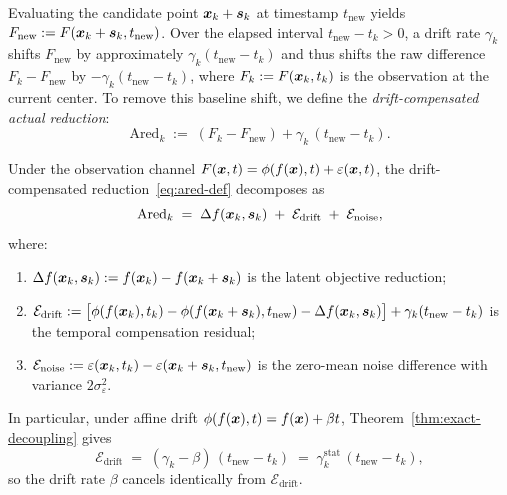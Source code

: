 Evaluating the candidate point $\boldsymbol{x}_k + \boldsymbol{s}_k$ at timestamp $t_{\mathrm{new}}$ yields $F_{\mathrm{new}} := F(\boldsymbol{x}_k + \boldsymbol{s}_k, t_{\mathrm{new}})$. Over the elapsed interval $t_{\mathrm{new}} - t_k > 0$, a drift rate $\gamma_k$ shifts $F_{\mathrm{new}}$ by approximately $\gamma_k(t_{\mathrm{new}} - t_k)$ and thus shifts the raw difference $F_k - F_{\mathrm{new}}$ by $-\gamma_k(t_{\mathrm{new}} - t_k)$, where $F_k := F(\boldsymbol{x}_k, t_k)$ is the observation at the current center. To remove this baseline shift, we define the \emph{drift-compensated actual reduction}:
\begin{equation}\label{eq:ared-def}
  \mathrm{Ared}_k \;:=\; (F_k - F_{\mathrm{new}}) + \gamma_k\,(t_{\mathrm{new}} - t_k).
\end{equation}

\begin{proposition}
\label{prop:ared-decomp}
Under the observation channel $F(\boldsymbol{x},t) = \phi(f(\boldsymbol{x}),t) + \varepsilon(\boldsymbol{x},t)$, the drift-compensated reduction~\eqref{eq:ared-def} decomposes as
\begin{equation}\label{eq:ared-three-terms}
  \mathrm{Ared}_k \;=\; \Delta f(\boldsymbol{x}_k, \boldsymbol{s}_k) \;+\; \mathcal{E}_{\mathrm{drift}} \;+\; \mathcal{E}_{\mathrm{noise}},
\end{equation}
where:
\begin{enumerate}[\rm(i)]
  \item $\Delta f(\boldsymbol{x}_k, \boldsymbol{s}_k) := f(\boldsymbol{x}_k) - f(\boldsymbol{x}_k + \boldsymbol{s}_k)$ is the latent objective reduction;
  \item $\mathcal{E}_{\mathrm{drift}} := \bigl[\phi(f(\boldsymbol{x}_k), t_k) - \phi(f(\boldsymbol{x}_k+\boldsymbol{s}_k), t_{\mathrm{new}}) - \Delta f(\boldsymbol{x}_k, \boldsymbol{s}_k)\bigr] + \gamma_k (t_{\mathrm{new}} - t_k)$ is the temporal compensation residual;
  \item $\mathcal{E}_{\mathrm{noise}} := \varepsilon(\boldsymbol{x}_k, t_k) - \varepsilon(\boldsymbol{x}_k + \boldsymbol{s}_k, t_{\mathrm{new}})$ is the zero-mean noise difference with variance $2\sigma_\varepsilon^2$.
\end{enumerate}
In particular, under affine drift $\phi(f(\boldsymbol{x}), t) = f(\boldsymbol{x}) + \beta t$, Theorem~\ref{thm:exact-decoupling} gives
\begin{equation}\label{eq:ared-affine-residual}
  \mathcal{E}_{\mathrm{drift}}
  \;=\; (\gamma_k-\beta)\,(t_{\mathrm{new}}-t_k)
  \;=\; \gamma_k^{\mathrm{stat}}\,(t_{\mathrm{new}}-t_k),
\end{equation}
so the drift rate $\beta$ cancels identically from $\mathcal{E}_{\mathrm{drift}}$.
\end{proposition}


